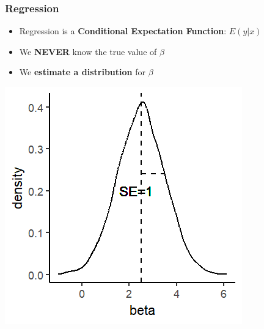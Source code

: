 \documentclass[xcolor=x11names,compress]{beamer}\usepackage[]{graphicx}\usepackage[]{color}
\makeatletter
\def\maxwidth{ %
  \ifdim\Gin@nat@width>\linewidth
    \linewidth
  \else
    \Gin@nat@width
  \fi
}
\newenvironment{knitrout}{}{} %
\renewcommand{\(}{\begin{columns}}
\renewcommand{\)}{\end{columns}}
\newcommand{\<}[1]{\begin{column}{#1}}
\renewcommand{\>}{\end{column}}
\makeatother
\begin{document}
\begin{frame}
\frametitle{Regression}
\begin{itemize}
\item Regression is a \textbf{Conditional Expectation Function}: $E(y|x)$
\item We \textbf{NEVER} know the true value of $\beta$
\item We \textbf{estimate a distribution} for $\beta$
\end{itemize}
\begin{knitrout}
\color{fgcolor}
\includegraphics[width=\maxwidth]{figure/beta_dist3-1} 

\end{knitrout}
\end{frame}
\end{document}
